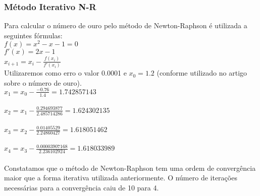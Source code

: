 \documentclass[11pt]{article}
\begin{document}
\subsubsection{Método Iterativo N-R}
Para calcular o número de ouro pelo método de Newton-Raphson é utilizada a seguintes fórmulas: \\
$f(x) = x^2 - x - 1 = 0$ \\
$f'(x) = 2x - 1$\\
$x_{i+1} = x_i - \frac{f(x_i)}{f'(x_i)}$ \\
Utilizaremos como erro o valor 0.0001 e $x_0 = 1.2$ (conforme utilizado no artigo sobre o número de ouro). \\
$x_1 = x_0 - \frac{-0.76}{1.4} = 1.742857143$ \\
\\
$x_2 = x_1 - \frac{0.294693877}{2.485714286} = 1.624302135$ \\
\\
$x_3 = x_2 - \frac{0.01405529}{2.24860427} = 1.618051462$ \\
\\
$x_4 = x_3 - \frac{0.00003907168}{2.236102924} = 1.618033989$ \\
\\

Constatamos que o método de Newton-Raphson tem uma ordem de convergência maior que a forma iterativa utilizada anteriormente.
O número de iterações necessárias para a convergência caiu de 10 para 4. \\
\end{document}
